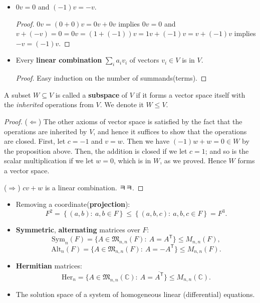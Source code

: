 \begin{prop}
\leavevmode

\begin{itemize}

\item $0v = 0$ and $(-1)v = -v$.
\begin{proof} $0v=(0+0)v=0v+0v$ implies $0v=0$ and $v+(-v)=0=0v=(1+(-1))v=1v+(-1)v=v+(-1)v$ implies $-v=(-1)v.$
\end{proof}
\item Every \textbf{linear combination} $\sum_i a_i v_i$ of vectors $v_i \in V$ is in $V.$
\begin{proof} Easy induction on the number of summands(terms).
\end{proof}
\end{itemize}
\end{prop}

\begin{defn}
A subset $W\subseteq V$ is called a \textbf{subspace} of $V$ if it forms a vector space itself with the \textit{inherited} operations from $V$. We denote it $W\le V.$
\end{defn}
\begin{proof}
($\Leftarrow$) The other axioms of vector space is satisfied by the fact that the operations are inherited by $V$, and hence it suffices to show that the operations are closed. First, let $c=-1$ and $v=w.$ Then we have $(-1)w + w = 0 \in W$ by the proposition above. Then, the addition is closed if we let $c=1$; and so is the scalar multiplication if we let $w=0$, which is in $W$, as we proved. Hence $W$ forms a vector space.

($\Rightarrow$) $cv+w$ is a linear combination. ㅋㅋ.
\end{proof}
\begin{ex}
\leavevmode
\begin{itemize}
\item Removing a coordinate(\textbf{projection}): $$F^2 = \left\{(a,b):~a,b\in F\right\} \le \left\{(a,b,c):~a,b,c\in F\right\} = F^3.$$
\item \textbf{Symmetric}, \textbf{alternating} matrices over $F$: $$\mathrm{Sym}_n(F) = \{A \in \mathfrak M_{n,n}(F):~A=A^{\mathsf T}\} \le M_{n,n}(F),$$
$$\mathrm{Alt}_n(F) = \{A \in \mathfrak M_{n,n}(F):~A=-A^{\mathsf T}\} \le M_{n,n}(F).$$
\item \textbf{Hermitian} matrices: $$\mathrm{Her}_n = \{A \in \mathfrak M_{n,n}(\mathbb C):~A=\overline{A^{\mathsf T}}\} \le M_{n,n}(\mathbb C).$$
\item The solution space of a system of homogeneous linear (differential) equations.
\end{itemize}
\end{ex}


